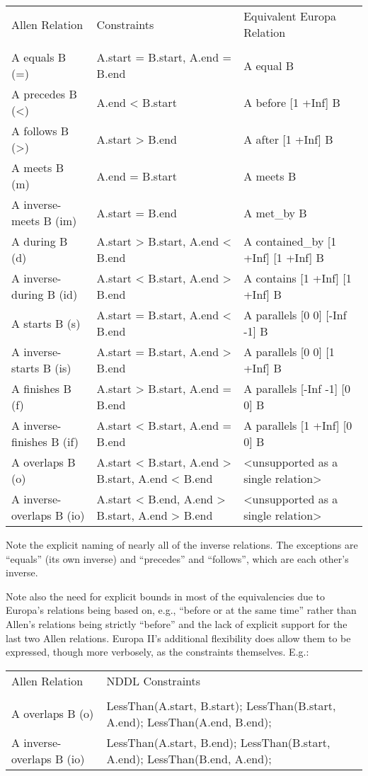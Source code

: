 \documentclass[10pt, letterpaper, twoside]{article}
\begin{document}
\begin{tabular}{lll}
Allen Relation & Constraints & Equivalent Europa Relation \\
\cline{1-3} \\
A equals B (=) & A.start = B.start, A.end = B.end & A equal B \\
A precedes B (<) & A.end < B.start & A before [1 +Inf] B \\
A follows B (>) & A.start > B.end & A after [1 +Inf] B \\
A meets B (m) & A.end = B.start & A meets B \\
A inverse-meets B (im) & A.start = B.end & A met\_by B \\
A during B (d) & A.start > B.start, A.end < B.end & A contained\_by [1 +Inf] [1 +Inf] B \\
A inverse-during B (id) & A.start < B.start, A.end > B.end & A contains [1 +Inf] [1 +Inf] B \\
A starts B (s) & A.start = B.start, A.end < B.end & A parallels [0 0] [-Inf -1] B \\
A inverse-starts B (is) & A.start = B.start, A.end > B.end & A parallels [0 0] [1 +Inf] B \\
A finishes B (f) & A.start > B.start, A.end = B.end & A parallels [-Inf -1] [0 0] B \\
A inverse-finishes B (if) & A.start < B.start, A.end = B.end & A parallels [1 +Inf] [0 0] B \\
A overlaps B (o) & A.start < B.start, A.end > B.start, A.end < B.end & <unsupported as a single relation> \\
A inverse-overlaps B (io) & A.start < B.end, A.end > B.start, A.end > B.end & <unsupported as a single relation> \\
\end{tabular}

Note the explicit naming of nearly all of the inverse relations.
The exceptions are ``equals'' (its own inverse) and ``precedes'' and
``follows'', which are each other's inverse.

Note also the need for explicit bounds in most of the equivalencies
due to Europa's relations being based on, e.g., ``before or at the same
time'' rather than Allen's relations being strictly ``before'' and the
lack of explicit support for the last two Allen relations.  Europa
II's additional flexibility does allow them to be expressed, though
more verbosely, as the constraints themselves.  E.g.:

\begin{tabular}{ll}
Allen Relation & NDDL Constraints \\
\cline{1-2} \\
A overlaps B (o) & LessThan(A.start, B.start); LessThan(B.start, A.end); LessThan(A.end, B.end); \\
A inverse-overlaps B (io) & LessThan(A.start, B.end); LessThan(B.start, A.end); LessThan(B.end, A.end); \\
\end{tabular}
\end{document}
